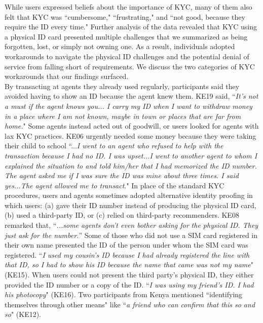 While users expressed beliefs about the importance of KYC, many of them also felt that KYC was ``cumbersome," ``frustrating," and ``not good, because they require the ID every time." Further analysis of the data revealed that KYC using a physical ID card presented multiple challenges that we summarized as being forgotten, lost, or simply not owning one. As a result, individuals adopted workarounds to navigate the physical ID challenges and the potential denial of service from falling short of requirements. We discuss the two categories of KYC workarounds that our findings surfaced.
\\
By transacting at agents they already used regularly, participants said they avoided  having to show an ID because the agent knew them. KE19 said, ``\textit{It's not a must if the agent knows you... I carry my ID when I want to withdraw money in a place where I am not known, maybe in town or places that are far from home.}" Some agents instead acted out of goodwill, or users looked for agents with lax KYC practices. KE06 urgently needed some money because they were taking their child to school ``...\textit{I went to an agent who refused to help with the transaction because I had no ID. I was upset...I went to another agent to whom I explained the situation to and told him/her that I had memorized the ID number. The agent asked me if I was sure the ID was mine about three times. I said yes...The agent allowed me to transact}." 
In place of the standard KYC procedures, users and agents sometimes adopted alternative identity proofing in which users: (a) gave their ID number instead of producing the physical ID card, (b) used a third-party ID, or (c) relied on third-party recommenders. KE08 remarked that,  ``\textit{...some agents don’t even bother asking for the physical ID. They just ask for the number.}” Some of those who did not use a SIM card registered in their own name presented the ID of the person under whom the SIM card was registered. ``\textit{I used my cousin’s ID because I had already registered the line with that ID, so I had to show his ID because the name that came was not my name}" (KE15).
When users could not present the third party's physical ID, they either provided the ID number or a copy of the  ID. ``\textit{I was using my friend's ID. I had his photocopy}" (KE16). Two participants from Kenya mentioned ``identifying themselves through other means" like ``\textit{a friend who can confirm that this so and so}" (KE12).
